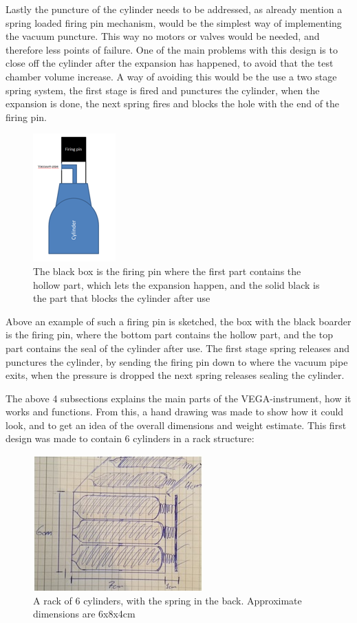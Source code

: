 Lastly the puncture of the cylinder needs to be addressed, as already mention a spring loaded firing pin mechanism, would be the simplest way of implementing the vacuum puncture. This way no motors or valves would be needed, and therefore less points of failure. One of the main problems with this design is to close off the cylinder after the expansion has happened, to avoid that the test chamber volume increase. A way of avoiding this would be the use a two stage spring system, the first stage is fired and punctures the cylinder, when the expansion is done, the next spring fires and blocks the hole with the end of the firing pin.

\begin{figure}[htb]
  \centering
  \includegraphics[scale=1]{figures/GasDetectionAgge/Firingpin}
  \caption{The black box is the firing pin where the first part contains the hollow part, which lets the expansion happen, and the solid black is the part that blocks the cylinder after use}
\end{figure}

Above an example of such a firing pin is sketched, the box with the black boarder is the firing pin, where the bottom part contains the hollow part, and the top part contains the seal of the cylinder after use. The first stage spring releases and punctures the cylinder, by sending the firing pin down to where the vacuum pipe exits, when the pressure is dropped the next spring releases sealing the cylinder.

The above 4 subsections explains the main parts of the VEGA-instrument, how it works and functions. From this, a hand drawing was made to show how it could look, and to get an idea of the overall dimensions and weight estimate. This first design was made to contain 6 cylinders in a rack structure:

\begin{figure}[htb]
  \centering
  \includegraphics[scale=1]{figures/GasDetectionAgge/CylinderRack}
  \caption{A rack of 6 cylinders, with the spring in the back. Approximate dimensions are 6x8x4cm}
\end{figure}


